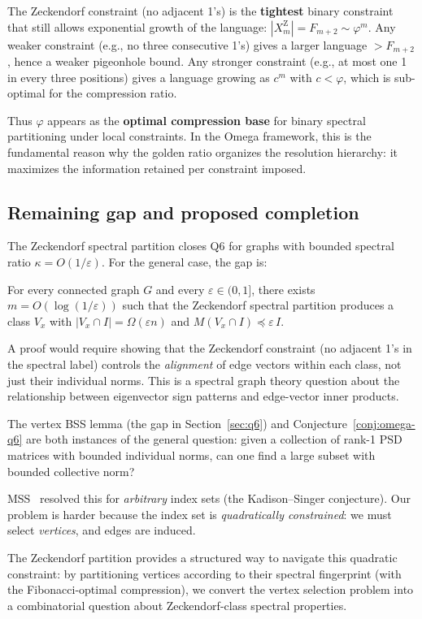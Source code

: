\begin{remark}
The Zeckendorf constraint (no adjacent 1's) is the
\textbf{tightest} binary constraint that still allows
exponential growth of the language: $|X_m^{\mathrm Z}|=F_{m+2}\sim\varphi^m$.
Any weaker constraint (e.g., no three consecutive 1's) gives
a larger language $>F_{m+2}$, hence a weaker pigeonhole bound.
Any stronger constraint (e.g., at most one 1 in every three positions)
gives a language growing as $c^m$ with $c<\varphi$, which is
sub-optimal for the compression ratio.

Thus $\varphi$ appears as the \textbf{optimal compression base}
for binary spectral partitioning under local constraints.
In the Omega framework, this is the fundamental reason why the
golden ratio organizes the resolution hierarchy: it maximizes
the information retained per constraint imposed.
\end{remark}


\subsection{Remaining gap and proposed completion}

The Zeckendorf spectral partition closes Q6 for graphs with
bounded spectral ratio $\kappa=O(1/\varepsilon)$.
For the general case, the gap is:

\begin{conjecture}\label{conj:omega-q6}
For every connected graph $G$ and every $\varepsilon\in(0,1]$,
there exists $m=O(\log(1/\varepsilon))$ such that the Zeckendorf
spectral partition produces a class $V_x$ with $|V_x\cap I|=\Omega(\varepsilon n)$
and $M(V_x\cap I)\preceq\varepsilon\,I$.
\end{conjecture}

A proof would require showing that the Zeckendorf constraint
(no adjacent 1's in the spectral label) controls the
\emph{alignment} of edge vectors within each class, not just
their individual norms.  This is a spectral graph theory question
about the relationship between eigenvector sign patterns and
edge-vector inner products.

\begin{remark}
The vertex BSS lemma (the gap in Section~\ref{sec:q6}) and
Conjecture~\ref{conj:omega-q6} are both instances of the
general question: given a collection of rank-1 PSD matrices
with bounded individual norms, can one find a large subset
with bounded collective norm?

MSS~\cite{mss2015} resolved this for \emph{arbitrary} index sets
(the Kadison--Singer conjecture).
Our problem is harder because the index set is \emph{quadratically
constrained}: we must select \emph{vertices}, and edges are induced.

The Zeckendorf partition provides a structured way to navigate this
quadratic constraint: by partitioning vertices according to their
spectral fingerprint (with the Fibonacci-optimal compression),
we convert the vertex selection problem into a combinatorial
question about Zeckendorf-class spectral properties.
\end{remark}


